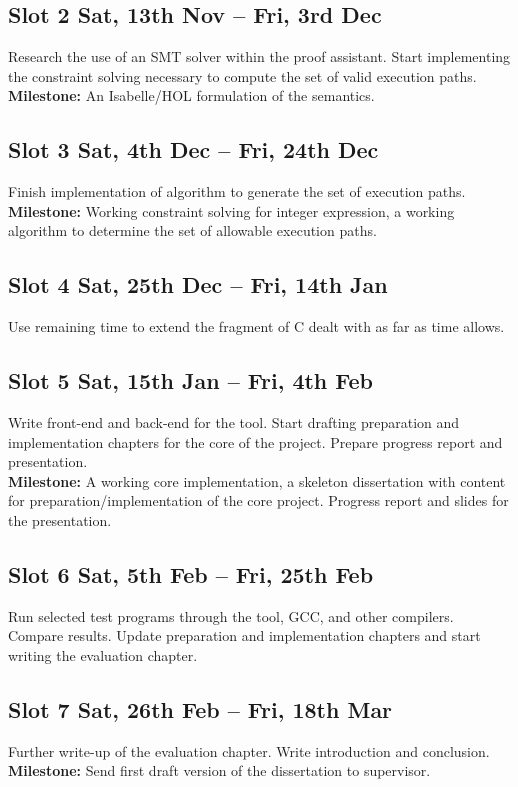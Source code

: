 \documentclass[a4paper,12pt]{scrbook}
\theoremstyle{plain}
\theoremstyle{definition}
\begin{document}
\subsection*{Slot 2 \hfill {\small Sat, 13th Nov -- Fri, 3rd Dec}}
Research the use of an SMT solver within the proof assistant. Start implementing the constraint solving necessary to compute the set of valid execution paths.
\\
{\bfseries Milestone:} An Isabelle/HOL formulation of the semantics.

\subsection*{Slot 3 \hfill {\small Sat, 4th Dec -- Fri, 24th Dec}}
Finish implementation of algorithm to generate the set of execution paths. 
\\
{\bfseries Milestone:} Working constraint solving for integer expression, a working algorithm to determine the set of allowable execution paths.

\subsection*{Slot 4 \hfill {\small Sat, 25th Dec -- Fri, 14th Jan}}
Use remaining time to extend the fragment of C dealt with as far as time allows.

\subsection*{Slot 5 \hfill {\small Sat, 15th Jan -- Fri, 4th Feb}}
Write front-end and back-end for the tool. Start drafting preparation and implementation chapters for the core of the project. Prepare progress report and presentation.
\\
{\bfseries Milestone:} A working core implementation, a skeleton dissertation with content for preparation/implementation of the core project. Progress report and slides for the presentation.

\subsection*{Slot 6 \hfill {\small Sat, 5th Feb -- Fri, 25th Feb}}
Run selected test programs through the tool, GCC, and other compilers. Compare results. Update preparation and implementation chapters and start writing the evaluation chapter.

\subsection*{Slot 7 \hfill {\small Sat, 26th Feb -- Fri, 18th Mar}}
Further write-up of the evaluation chapter. Write introduction and conclusion.
\\
{\bfseries Milestone:} Send first draft version of the dissertation to supervisor.
\end{document}
